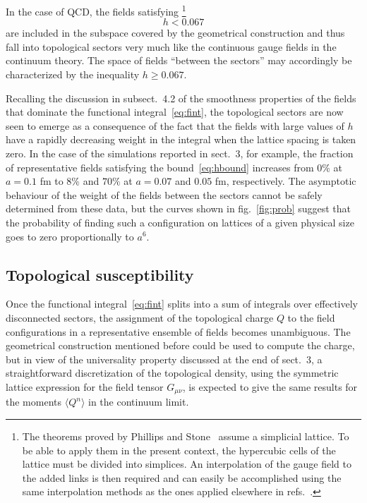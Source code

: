 In the case of QCD, the fields satisfying%
\footnote{The theorems proved by Phillips and Stone~\cite{PhillipsStone}
assume a simplicial lattice. To be able to apply them
in the present context, the hypercubic cells of the
lattice must be divided
into simplices. An interpolation of the gauge field to the
added links is then required and can easily be accomplished
using the same interpolation methods as the ones applied elsewhere
in refs.~\cite{TopCharge,PhillipsStone}.}
\begin{equation}
   h<0.067
   \label{eq:hbound}
\end{equation}
are included in the subspace covered by the geometrical construction
and thus fall into topological sectors very much like
the continuous gauge fields in the continuum theory. The space of fields
``between the sectors'' may accordingly be characterized
by the inequality $h\geq 0.067$.

Recalling the discussion in subsect.~4.2
of the smoothness properties of the fields that dominate
the functional integral~\eqref{eq:fint}, the topological sectors
are now seen to emerge as a consequence of the fact that
the fields with large values of $h$ have a rapidly
decreasing weight in the integral when the lattice
spacing is taken zero.
In the case of the simulations reported in sect.~3, for example,
the fraction of representative fields satisfying the bound~\eqref{eq:hbound}
increases from $0\%$ at $a=0.1$ fm to $8\%$ and $70\%$ at
$a=0.07$ and $0.05$ fm, respectively.
The asymptotic behaviour of the weight of the fields
between the sectors cannot be safely determined from these
data, but the curves shown in fig.~\ref{fig:prob} suggest that the
probability of finding such a configuration
on lattices of a given physical size
goes to zero proportionally to $a^6$.


\subsection{Topological susceptibility}

Once the functional integral~\eqref{eq:fint} splits
into a sum of integrals over effectively
disconnected sectors,
the assignment of the topological charge $Q$
to the field configurations
in a representative ensemble of fields
becomes unambiguous.
The geometrical construction mentioned before
could be used to compute the charge, but
in view of the universality property
discussed at the end of sect.~3,
a straightforward discretization of
the topological density, using the symmetric lattice
expression for the field tensor $G_{\mu\nu}$,
is expected to give the same results for the moments
$\langle Q^n\rangle$ in the continuum limit.

